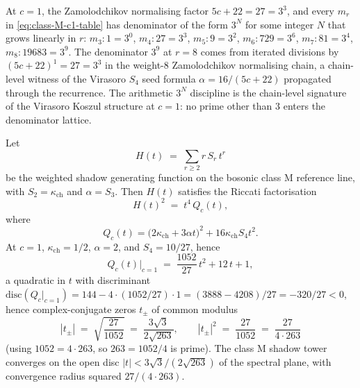 \begin{remark}[Denominator structure \texorpdfstring{$3^N$}{3-N} from \texorpdfstring{$5c + 22 = 27$}{5c + 22 = 27}]
\label{rem:denominator-3N-forced}
At $c = 1$, the Zamolodchikov normalising factor $5c + 22 = 27 = 3^3$,
and every $m_r$ in \eqref{eq:class-M-c1-table} has denominator of the
form $3^N$ for some integer $N$ that grows linearly in $r$:
$m_3 : 1 = 3^0$, $m_4 : 27 = 3^3$, $m_5 : 9 = 3^2$,
$m_6 : 729 = 3^6$, $m_7 : 81 = 3^4$,
$m_8 : 19683 = 3^9$. The denominator $3^9$ at $r = 8$ comes from
iterated divisions by $(5c + 22)^{1} = 27 = 3^3$ in the
weight-$8$ Zamolodchikov normalising chain, a chain-level witness of
the Virasoro $S_4$ seed formula $\alpha = 16/(5c + 22)$ propagated
through the recurrence. The arithmetic $3^N$ discipline is the
chain-level signature of the Virasoro Koszul structure at $c = 1$:
no prime other than $3$ enters the denominator lattice.
\end{remark}

\begin{theorem}
\label{thm:riccati-factorisation-class-M}
Let
\[
H(t) \;=\; \sum_{r \ge 2} r\,S_r\,t^r
\]
be the weighted shadow generating function on the bosonic class M
reference line, with $S_2=\kappa_{\mathrm{ch}}$ and
$\alpha=S_3$. Then $H(t)$ satisfies the Riccati factorisation
\begin{equation}
\label{eq:riccati-H-squared-t4Qc}
H(t)^2 \;=\; t^4 \, Q_c(t),
\end{equation}
where
\[
Q_c(t)=\bigl(2\kappa_{\mathrm{ch}}+3\alpha t\bigr)^2
+16\kappa_{\mathrm{ch}}S_4t^2.
\]
At $c = 1$, $\kappa_{\mathrm{ch}}=1/2$, $\alpha=2$, and
$S_4=10/27$, hence
\begin{equation}
\label{eq:Qc-at-c-equals-1}
Q_c(t)\big|_{c = 1} \;=\; \frac{1052}{27} \, t^2 + 12 \, t + 1,
\end{equation}
a quadratic in $t$ with discriminant $\mathrm{disc}(Q_c|_{c = 1})
= 144 - 4 \cdot (1052/27) \cdot 1 = (3888 - 4208)/27 = -320/27 < 0$,
hence complex-conjugate zeros $t_\pm$ of common modulus
\begin{equation}
\label{eq:Qc-zero-modulus}
|t_\pm| \;=\; \sqrt{\frac{27}{1052}} \;=\; \frac{3 \sqrt{3}}{2 \sqrt{263}},
\qquad
|t_\pm|^2 \;=\; \frac{27}{1052} \;=\; \frac{27}{4 \cdot 263}
\end{equation}
(using $1052 = 4 \cdot 263$, so $263 = 1052/4$ is prime). The class M
shadow tower converges on the open disc
$|t| < 3\sqrt{3}/(2\sqrt{263})$ of the spectral plane, with
convergence radius squared $27/(4 \cdot 263)$.
\end{theorem}

